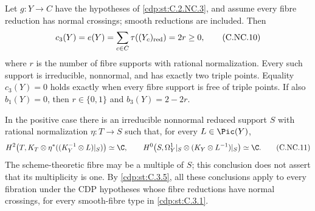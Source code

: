 
\begin{proposition}\label{cdp:st:C.2.NC.5}
Let $g:Y\to C$ have the hypotheses of \ref{cdp:st:C.2.NC.3}, and assume every fibre reduction has normal crossings; smooth reductions are included. Then
\[
 c_3(Y)=e(Y)=\sum_{c\in C}\tau((Y_c)_{\rm red})=2r\ge0,
 \tag{C.NC.10}\label{cdp:eq:C.NC.10}
\]
where $r$ is the number of fibre supports with rational normalization. Every such support is irreducible, nonnormal, and has exactly two triple points. Equality $c_3(Y)=0$ holds exactly when every fibre support is free of triple points. If also $b_1(Y)=0$, then $r\in\{0,1\}$ and $b_3(Y)=2-2r$.

In the positive case there is an irreducible nonnormal reduced support $S$ with rational normalization $\eta:T\to S$ such that, for every $L\in\Pic(Y)$,
\[
 H^2\!\left(T,K_T\otimes\eta^*((K_Y^{-1}\otimes L)|_S)\right)\simeq\C,
 \qquad
 H^0\!\left(S,\Omega_Y^1|_S\otimes(K_Y\otimes L^{-1})|_S\right)\simeq\C.
 \tag{C.NC.11}\label{cdp:eq:C.NC.11}
\]
The scheme-theoretic fibre may be a multiple of $S$; this conclusion does not assert that its multiplicity is one. By \ref{cdp:st:C.3.5}, all these conclusions apply to every fibration under the CDP hypotheses whose fibre reductions have normal crossings, for every smooth-fibre type in \ref{cdp:st:C.3.1}.
\end{proposition}
